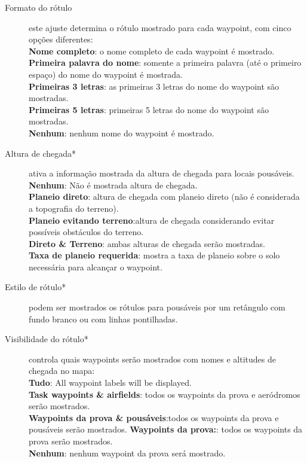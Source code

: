 \begin{description}
\item[Formato do rótulo]  este ajuste  \label{conf:labels} determina o rótulo mostrado 
  para cada waypoint, com cinco opções diferentes: \\
  {\bf Nome completo}: o nome completo de cada waypoint é mostrado. \\
  {\bf Primeira palavra do nome}: somente a primeira palavra (até o primeiro espaço) do nome do waypoint é mostrada.
 \\
  {\bf Primeiras 3 letras}: as primeiras 3 letras do nome do waypoint são mostradas. \\
  {\bf Primeiras 5 letras}: primeiras 5 letras do nome do waypoint são mostradas. \\
  {\bf Nenhum}: nenhum nome do waypoint é mostrado.
\item[Altura de chegada*] \label{conf:arrivalheight} ativa a informação mostrada da altura de chegada para locais pousáveis. \\
  {\bf Nenhum}: Não é mostrada altura de chegada. \\
  {\bf Planeio direto}: altura de chegada com planeio direto (não é considerada a topografia do terreno). \\
  {\bf Planeio evitando terreno}:altura de chegada considerando evitar possíveis obstáculos do terreno.  \\
  {\bf Direto \& Terreno}: ambas alturas de chegada serão mostradas. \\
  {\bf Taxa de planeio requerida}: mostra a taxa de planeio sobre o solo necessária para alcançar o waypoint.
\item[Estilo de rótulo*]  podem ser mostrados os rótulos para pousáveis por um retângulo com fundo branco ou com linhas pontilhadas.
\item[Visibilidade do rótulo*]  \label{conf:labelvisibility} controla quais waypoints serão mostrados com nomes e altitudes de chegada no mapa: \\
  {\bf Tudo}: All waypoint labels will be displayed. \\
  {\bf Task waypoints \& airfields}: todos os waypoints da prova e aeródromos serão mostrados. \\
  {\bf Waypoints da prova \& pousáveis}:todos os waypoints da prova e pousáveis serão mostrados.
  {\bf Waypoints da prova:}: todos os waypoints da prova serão mostrados. \\
  {\bf Nenhum}:  nenhum waypoint da prova será mostrado.

\end{description}
